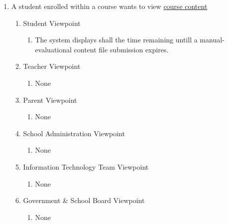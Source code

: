 \documentclass[]{article}
\begin{document}
\begin{enumerate}[{BE}1.]
	\item A student enrolled within a course wants to view \underline{course 
content}
	\begin{enumerate}[{VP2}.1]
		\item Student Viewpoint
			\begin{enumerate}
				\item The system displays shall the time remaining untill a 
manual-evaluational
content file submission expires.
			\end{enumerate}
		\item Teacher Viewpoint
			\begin{enumerate}
				\item None
			\end{enumerate}
		\item Parent Viewpoint
			\begin{enumerate}
				\item None
			\end{enumerate}
		\item School Administration Viewpoint
			\begin{enumerate}
				\item None
			\end{enumerate}
		\item Information Technology Team Viewpoint
			\begin{enumerate}
				\item None
			\end{enumerate}
		\item Government \& School Board Viewpoint
			\begin{enumerate}
				\item None
			\end{enumerate}
	\end{enumerate}



\end{enumerate}
\end{document}
